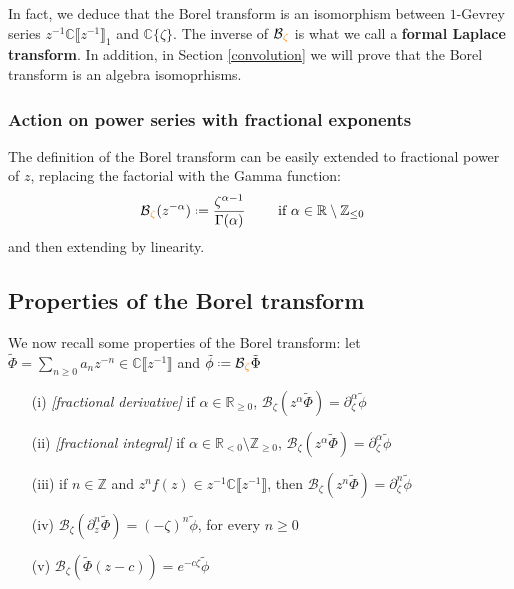 \documentclass{article}
\theoremstyle{definition}
\newcommand{\Z}{\mathbb{Z}}
\newcommand{\R}{\mathbb{R}}
\newcommand{\C}{\mathbb{C}}
\newcommand*{\defeq}{\mathrel{\vcenter{\baselineskip0.5ex \lineskiplimit0pt
                     \hbox{\scriptsize.}\hbox{\scriptsize.}}}%
                     =}
\newcommand{\borel}{\mathcal{B}}
\begin{document}
In fact, we deduce that the Borel transform is an isomorphism between $1$-Gevrey series $z^{-1}\C\llbracket z^{-1}\rrbracket_1$ and $\C\lbrace\zeta\rbrace$. The inverse of $\borel\textcolor{orange}{_\zeta}$ is what we call a \textbf{formal Laplace transform}. In addition, in Section \ref{convolution} we will prove that the Borel transform is an algebra isomoprhisms. 


\subsubsection{Action on power series with fractional exponents}
The definition of the Borel transform can be easily extended to fractional power of $z$, replacing the factorial with the Gamma function: 
\begin{align*}
\borel\textcolor{orange}{_\zeta}(z^{-\alpha})\defeq \frac{\zeta^{\alpha-1}}{\Gamma(\alpha)} & \qquad \text{ if } \alpha\in\R\setminus\Z_{\leq 0}
\end{align*}
and then extending by linearity.

\subsection{Properties of the Borel transform}\label{properties Borel transform}
We now recall some properties of the Borel transform: let $\tilde{\Phi}=\sum_{n\geq 0}a_nz^{-n}\in\C\llbracket z^{-1}\rrbracket$ and $\tilde{\phi}\defeq\borel\textcolor{orange}{_\zeta}\tilde{\Phi}$
\begin{itemize}
\item[(i)] \emph{[fractional derivative]} if $\alpha\in\R_{\geq 0}$, $\borel_\zeta\left(z^\alpha \tilde{\Phi}\right)=\partial_{\zeta}^{\alpha}\tilde{\phi}$
\item[(ii)] \emph{[fractional integral]} if $\alpha\in\R_{<0}\setminus\Z_{\geq 0}$, $\borel_\zeta\left(z^\alpha \tilde{\Phi}\right)=\partial_{\zeta}^{\alpha}\tilde{\phi}$
\item[(iii)] if $n\in\Z$ and $z^nf(z)\in z^{-1}\C \llbracket z^{-1} \rrbracket$, then $\borel_\zeta (z^n\tilde{\Phi})=\partial_\zeta^n\tilde{\phi}$ 
\item[(iv)] $\borel_\zeta\left(\partial_z^{n} \tilde{\Phi}\right)=(-\zeta)^n\tilde{\phi}$, for every $n\geq 0$
\item[(v)] $\borel_{\zeta}(\tilde{\Phi}(z-c))=e^{-c\zeta}\tilde{\phi}$
\end{itemize} 
\end{document}
